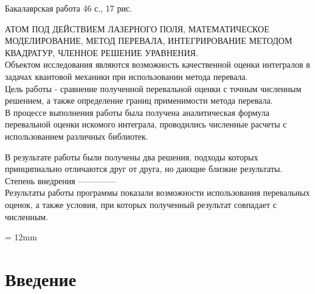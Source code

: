 \documentclass[%
bachelor,    %
natbib,      %
subf,        %
href,        %
colorlinks,  %
]{disser}
\newcommand{\sectionbreak}{\clearpage}
\begin{document}
\begin{flushleft}
	Бакалаврская работа 46 с., 17 рис.         \\
	\vspace{0.5cm}
	
	АТОМ ПОД ДЕЙСТВИЕМ ЛАЗЕРНОГО ПОЛЯ, МАТЕМАТИЧЕСКОЕ МОДЕЛИРОВАНИЕ, МЕТОД ПЕРЕВАЛА, ИНТЕГРИРОВАНИЕ МЕТОДОМ КВАДРАТУР, ЧЛЕННОЕ РЕШЕНИЕ УРАВНЕНИЯ.                     \\
	
	\vspace{0.5cm}
	Объектом исследования являются возможность качественной оценки интегралов в задачах квантовой механики при использовании метода перевала.                   \\
	\vspace{0.5cm}
	Цель работы - сравнение полученной перевальной оценки с точным численным решением, а также определение границ применимости метода перевала.                                     \\
	\vspace{0.5cm}
	В процессе выполнения работы была получена аналитическая формула перевальной оценки искомого интеграла, проводились численные расчеты с использованием различных библиотек.                              \\
	\vspace{0.5cm}
	
	В результате работы были получены два решения, подходы которых принципиально отличаются друг от друга, но дающие близкие результаты.                  \\
	\vspace{0.5cm}
	Степень внедрения --------------                                                  \\
	\vspace{0.5cm}
	Результаты работы программы показали возможности использования перевальных оценок, а также условия, при которых полученный результат совпадает с численным.
\end{flushleft}

{}
\parindent = 12mm

\thispagestyle{empty}
\tableofcontents
\sectionbreak
\section*{\centering Введение}
\end{document}
